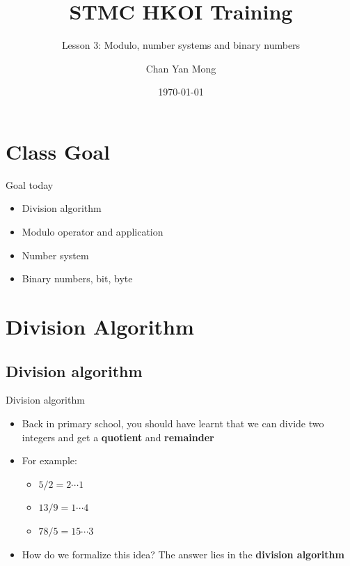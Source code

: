 \documentclass[10pt,xcolor={table,dvipsnames},t]{beamer}
\title[Your Short Title]{STMC HKOI Training}
\subtitle{Lesson 3: Modulo, number systems and binary numbers}
\author{Chan Yan Mong}
\date{\today}
\begin{document}
\begin{frame}
  \titlepage
\end{frame}


\section{Class Goal}

\begin{frame}{Goal today}

\begin{itemize}
  \item Division algorithm
  \item Modulo operator and application
  \item Number system
  \item Binary numbers, bit, byte
\end{itemize}

\end{frame}

\section{Division Algorithm}
\subsection{Division algorithm}
\begin{frame}{Division algorithm}
  \begin{itemize}
    \item Back in primary school, you should have learnt that we can divide two integers and get a \textbf{quotient} and \textbf{remainder}
    \item For example:
    \begin{itemize}
      \item $5/2 = 2 \cdots 1$
      \item $13/9 = 1 \cdots 4$
      \item $78/5 = 15 \cdots 3$
    \end{itemize} 
    \item How do we formalize this idea? The answer lies in the \textbf{division algorithm}
  \end{itemize}
\end{frame}
\end{document}

